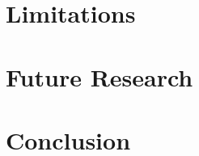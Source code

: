 
\section{Limitations}
\label{sec:conclusion-limitations}


\section{Future Research}
\label{sec:conclusion-future}


\section{Conclusion}
\label{sec:conclusion-final}

